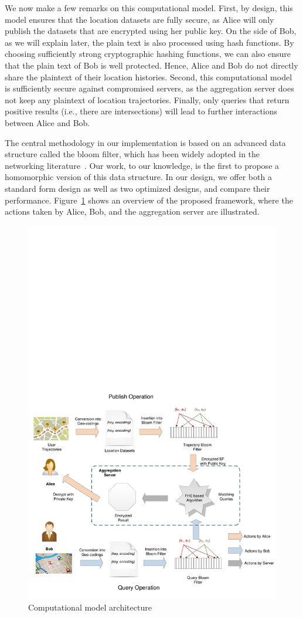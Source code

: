 We now make a few remarks on this computational model. First, by design, this model ensures that the location datasets are fully secure, as Alice will only publish the datasets that are encrypted using her public key. On the side of Bob, as we will explain later, the plain text is also processed using hash functions. By choosing sufficiently strong cryptographic hashing functions, we can also ensure that the plain text of Bob is well protected. Hence, Alice and Bob do not directly share the plaintext of their location histories. Second, this computational model is sufficiently secure against compromised servers, as the aggregation server does not keep any plaintext of location trajectories. Finally, only queries that return positive results (i.e., there are intersections) will lead to further interactions between Alice and Bob.

The central methodology in our implementation is based on an advanced data structure called the bloom filter, which has been widely adopted in the networking literature~\cite{broder2004network}. Our work, to our knowledge, is the first to propose a homomorphic version of this data structure. In our design, we offer both a standard form design as well as two optimized designs, and compare their performance. Figure~\ref{fig:architecture} shows an overview of the proposed framework, where the actions taken by Alice, Bob, and the aggregation server are illustrated. 

\begin{figure}[t]
	\centering
	\includegraphics[width=0.8\linewidth]{figures/architecture.pdf}
	\caption{Computational model architecture}
	\label{fig:architecture}
	\vspace{-0.1in}
\end{figure}


